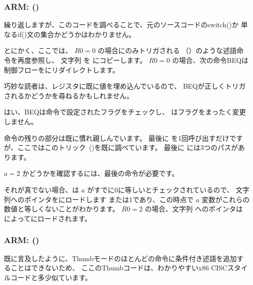 ﻿\subsubsection{ARM: \OptimizingKeilVI (\ARMMode)}



繰り返しますが、このコードを調べることで、元のソースコードのswitch()か
単なるif()文の集合かどうかはわかりません。


とにかく、ここでは、 $R0=0$ の場合にのみトリガされる \ADREQ（）のような述語命令を再度参照し、
文字列  を  にコピーします。
$R0=0$ の場合、次の命令\ac{BEQ}は制御フローをにリダイレクトします。

巧妙な読者は、レジスタに既に値を埋め込んでいるので、
\ac{BEQ}が正しくトリガされるかどうかを尋ねるかもしれません。

はい、\ac{BEQ}は\CMP 命令で設定されたフラグをチェックし、
\ADREQ はフラグをまったく変更しません。

命令の残りの部分は既に慣れ親しんでいます。
最後に \printf を1回呼び出すだけですが、ここではこのトリック~()を既に調べています。
最後に \printf{} には3つのパスがあります。

$a=2$ かどうかを確認するには、最後の命令が必要です。

それが真でない場合、\ADRNE は $a$ がすでに0に等しいとチェックされているので、
文字列へのポインタをにロードします 
または1であり、この時点で $a$ 変数がこれらの数値と等しくないことがわかります。
$R0=2$ の場合、文字列  へのポインタは \ADREQ によってにロードされます。

\subsubsection{ARM: \OptimizingKeilVI (\ThumbMode)}




既に言及したように、Thumbモードのほとんどの命令に条件付き述語を追加することはできないため、
ここのThumbコードは、わかりやすいx86 \ac{CISC}スタイルコードと多少似ています。

